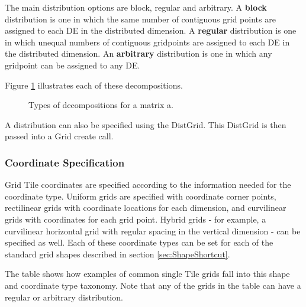 The main distribution options are block, regular and arbitrary.
A {\bf block} distribution is one in which the same number of
contiguous grid points are assigned to each DE in the
distributed dimension.  A {\bf regular} distribution is one in which
unequal numbers of contiguous gridpoints are assigned to each
DE in the distributed dimension.  An {\bf arbitrary} distribution is
one in which any gridpoint can be assigned to any DE.

Figure \ref{fig:GridDecomps} illustrates each of these decompositions.
 
\begin{center}
\begin{figure}
\caption{Types of decompositions for a matrix a.}
\label{fig:GridDecomps}
\end{figure}
\end{center}

A distribution can also be specified using the DistGrid.  This
DistGrid is then passed into a Grid create call.

\subsubsection{Coordinate Specification}

Grid Tile coordinates are specified
according to the information needed for the coordinate type.
Uniform grids are specified with coordinate corner
points, rectilinear grids with coordinate locations for each dimension,
and curvilinear grids with coordinates for each grid point.  Hybrid
grids - for example, a curvilinear horizontal grid with regular spacing
in the vertical dimension - can be specified as well.  Each of these
coordinate types can be set for each of the standard grid shapes
described in section \ref{sec:ShapeShortcut}.  

The table shows how examples of common single Tile grids fall 
into this shape and coordinate type taxonomy.  Note that any
of the grids in the table can have a regular or arbitrary distribution.

